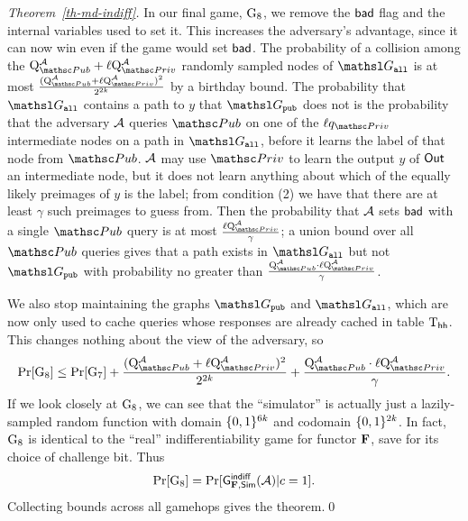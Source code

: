 \begin{proof}[Theorem~\ref{th-md-indiff}]
In our final game, $\textnormal{G}_8$, we remove the $\mathsf{bad}$ flag and the internal variables used to set it. 
This increases the adversary's advantage, since it can now win even if the game would set $\mathsf{bad}$.
The probability of a collision among the $\Queries{\PubO}{\advA} + \ell \Queries{\PrivO}{\advA}$ randomly sampled nodes of
$\graph_{\all}$ is at most $\frac{(\Queries{\PubO}{\advA} + \ell \Queries{\PrivO}{\advA})^2}{2^{2k}}$ by a birthday bound.
The probability that $\graph_{\all}$ contains a path to $y$ that $\graph_{\public}$ does not is the probability that the adversary $\mathcal{A}$ queries $\PubO$ on one of the $\ell q_{\PrivO}$ intermediate nodes on a path in $\graph_{\all}$, before it learns the label of that node from $\PubO$.
$\mathcal{A}$ may use $\PrivO$ to learn the output $y$ of $\mathsf{Out}$ an intermediate node, but it does not learn anything about which of the equally likely preimages of $y$ is the label; from condition (2) we have that there are at least $\gamma$ such preimages to guess from.
Then the probability that $\mathcal{A}$ sets $\mathsf{bad}$ with a single $\PubO$ query is at most $\frac{\ell \Queries{\PrivO}{\advA}}{\gamma}$; a union bound over all $\PubO$ queries gives
that a path exists in $\graph_{\all}$ but not $\graph_{\public}$ with probability no greater than $\frac{\Queries{\PubO}{\advA} \cdot \ell \Queries{\PrivO}{\advA}}{\gamma}$.

We also stop maintaining the graphs $\graph_{\public}$ and $\graph_{\all}$, which are now only used to cache queries whose responses are already cached in table $\text{T}_{\mathsf{hh}}$.
This changes nothing about the view of the adversary, so
\[ \Pr[\Gm_8] \leq \Pr[\Gm_7] + \frac{(\Queries{\PubO}{\advA} + \ell \Queries{\PrivO}{\advA})^2}{2^{2k}} + \frac{\Queries{\PubO}{\advA} \cdot \ell \Queries{\PrivO}{\advA}}{\gamma}. \]
If we look closely at $\textnormal{G}_8$, we can see that the ``simulator'' is actually just a lazily-sampled random function with domain $\{0,1\}^{6k}$ and codomain $\{0,1\}^{2k}$.
In fact, $\textnormal{G}_8$ is identical to the ``real'' indifferentiability game for functor $\mathbf{F}$, save for its choice of challenge bit.
Thus 
\[\Pr[\textnormal{G}_8] =  \Pr[\mathsf{G}^{\mathsf{indiff}}_{\mathbf{F}, \mathsf{Sim}}(\mathcal{A}) | c = 1]. \]
Collecting bounds across all gamehops gives the theorem.\qed
\end{proof}